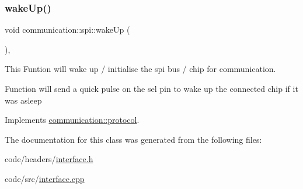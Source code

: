 \subsubsection{\texorpdfstring{wake\+Up()}{wakeUp()}}
{\footnotesize\ttfamily void communication\+::spi\+::wake\+Up (\begin{DoxyParamCaption}{ }\end{DoxyParamCaption})\hspace{0.3cm}{\ttfamily [override]}, {\ttfamily [virtual]}}



This Funtion will wake up / initialise the spi bus / chip for communication. 

Function will send a quick pulse on the sel pin to wake up the connected chip if it was asleep 

Implements \hyperlink{classcommunication_1_1protocol_aefe3def7b92b2eae8c98bfc542e27078}{communication\+::protocol}.



The documentation for this class was generated from the following files\+:\begin{DoxyCompactItemize}
\item 
code/headers/\hyperlink{interface_8h}{interface.\+h}\item 
code/src/\hyperlink{interface_8cpp}{interface.\+cpp}\end{DoxyCompactItemize}
